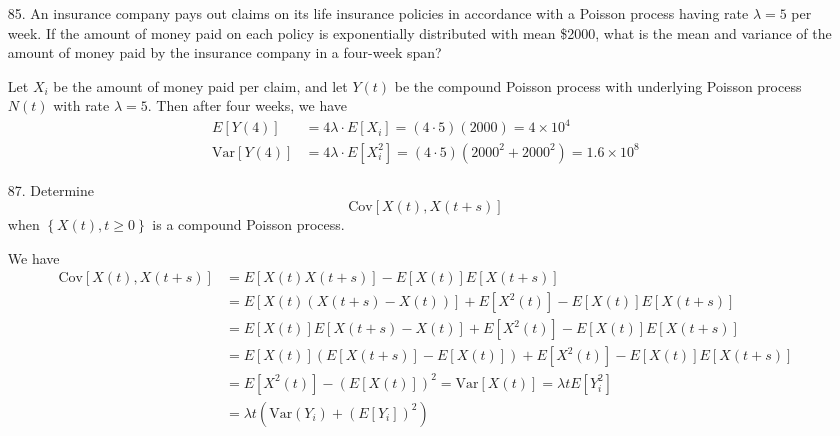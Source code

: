 \documentclass{article}
\newcommand{\var}{\mathrm{Var}}
\newcommand{\cov}{\mathrm{Cov}}
\begin{document}
\begin{itemize}
	\item[85.] An insurance company pays out claims on its life insurance policies in accordance with a Poisson process having rate $\lambda=5$ per week. If the amount of money paid on each policy is exponentially distributed with mean \$2000, what is the mean and variance of the amount of money paid by the insurance company in a four-week span?
		\begin{soln}
			Let $X_i$ be the amount of money paid per claim, and let $Y(t)$ be the compound Poisson process with underlying Poisson process $N(t)$ with rate $\lambda=5.$ Then after four weeks, we have
			\begin{align*}
				E[Y(4)] &= 4\lambda \cdot E[X_i] = (4\cdot 5)(2000) = \boxed{4\times 10^4} \\
				\var\left[ Y(4) \right] &= 4\lambda \cdot E[X_i^2] = (4\cdot 5)(2000^2+2000^2) = \boxed{1.6\times 10^8}
			\end{align*}
		\end{soln}

	\item[87.] Determine
		\[\cov\left[ X(t), X(t+s) \right]\]
		when $\left\{ X(t), t\ge0 \right\}$ is a compound Poisson process.
		\begin{soln}
			We have
			\begin{align*}
				\cov\left[ X(t), X(t+s) \right] &= E\left[ X(t) X(t+s) \right] - E\left[ X(t) \right]E\left[ X(t+s) \right] \\
				&= E\left[ X(t) \left( X(t+s)-X(t) \right) \right] + E\left[ X^2(t) \right] - E[X(t)]E[X(t+s)] \\
				&= E[X(t)] E[X(t+s)-X(t)] + E[X^2(t)] - E[X(t)]E[X(t+s)] \\
				&= E[X(t)] \left( E[X(t+s)] - E[X(t)] \right) + E[X^2(t)] - E[X(t)]E[X(t+s)] \\
				&= E[X^2(t)] - \left( E[X(t)] \right)^2 = \var\left[ X(t) \right] = \lambda t E[Y_i^2] \\
				&= \boxed{\lambda t\left( \var(Y_i)+(E[Y_i])^2 \right)}
			\end{align*}
		\end{soln}


\end{itemize}
\end{document}
